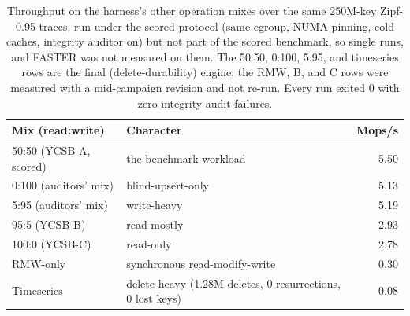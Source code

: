 \documentclass{article}
\newcommand{\HydraFinalWL}{5.50}        %
\newcommand{\WlZeroHundred}{5.13}       %
\newcommand{\WlFiveNinetyFive}{5.19}    %
\newcommand{\WlBNinetyFive}{2.93}       %
\newcommand{\WlCHundred}{2.78}          %
\newcommand{\WlRMW}{0.30}               %
\newcommand{\WlTimeseries}{0.08}        %
\newcommand{\NKeysShort}{250M}
\begin{document}
\begin{table}[t]
\centering
\caption{Throughput on the harness's other operation mixes over the same \NKeysShort-key Zipf-0.95 traces, run under the scored protocol (same cgroup, NUMA pinning, cold caches, integrity auditor on) but not part of the scored benchmark, so single runs, and FASTER was not measured on them. The 50:50, 0:100, 5:95, and timeseries rows are the final (delete-durability) engine; the RMW, B, and C rows were measured with a mid-campaign revision and not re-run. Every run exited 0 with zero integrity-audit failures.}
\label{tab:wl}
\small
\setlength{\tabcolsep}{4pt}
\begin{tabular}{@{}llr@{}}
\toprule
\textbf{Mix (read:write)} & \textbf{Character} & \textbf{Mops/s} \\
\midrule
50:50 (YCSB-A, scored)  & the benchmark workload            & \HydraFinalWL \\
0:100 (auditors' mix)   & blind-upsert-only                 & \WlZeroHundred \\
5:95 (auditors' mix)    & write-heavy                       & \WlFiveNinetyFive \\
95:5 (YCSB-B)           & read-mostly                       & \WlBNinetyFive \\
100:0 (YCSB-C)          & read-only                         & \WlCHundred \\
RMW-only                & synchronous read-modify-write     & \WlRMW \\
Timeseries              & delete-heavy (1.28M deletes, 0 resurrections, 0 lost keys) & \WlTimeseries \\
\bottomrule
\end{tabular}
\end{table}
\end{document}
